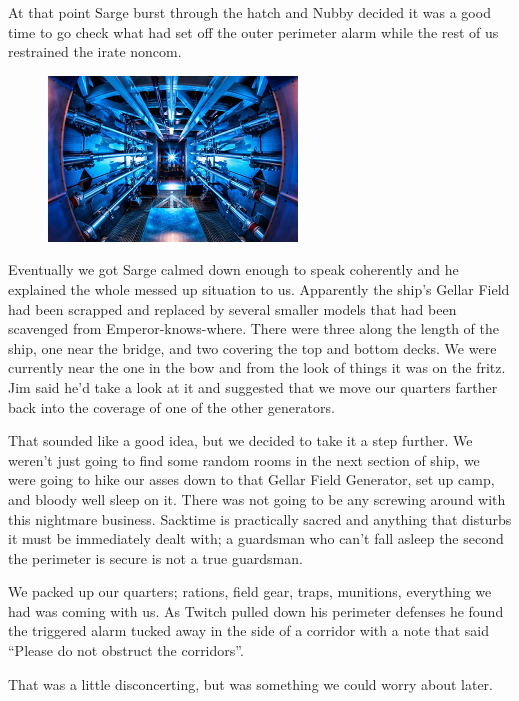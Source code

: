 At that point Sarge burst through the hatch and Nubby decided it was a good time to go check what had set off the outer perimeter alarm while the rest of us restrained the irate noncom.

\begin{figure}
	\begin{center}
		\includegraphics[width=\figwidth]{pics/7/16.png}
	\end{center}
\end{figure}
Eventually we got Sarge calmed down enough to speak coherently and he explained the whole messed up situation to us. 
Apparently the ship’s Gellar Field had been scrapped and replaced by several smaller models that had been scavenged from Emperor-knows-where. 
There were three along the length of the ship, one near the bridge, and two covering the top and bottom decks. 
We were currently near the one in the bow and from the look of things it was on the fritz. 
Jim said he’d take a look at it and suggested that we move our quarters farther back into the coverage of one of the other generators.

That sounded like a good idea, but we decided to take it a step further. 
We weren’t just going to find some random rooms in the next section of ship, we were going to hike our asses down to that Gellar Field Generator, set up camp, and bloody well sleep on it. 
There was not going to be any screwing around with this nightmare business. 
Sacktime is practically sacred and anything that disturbs it must be immediately dealt with; 
a guardsman who can’t fall asleep the second the perimeter is secure is not a true guardsman.

We packed up our quarters; 
rations, field gear, traps, munitions, everything we had was coming with us. 
As Twitch pulled down his perimeter defenses he found the triggered alarm tucked away in the side of a corridor with a note that said “Please do not obstruct the corridors”. 

That was a little disconcerting, but was something we could worry about later.

